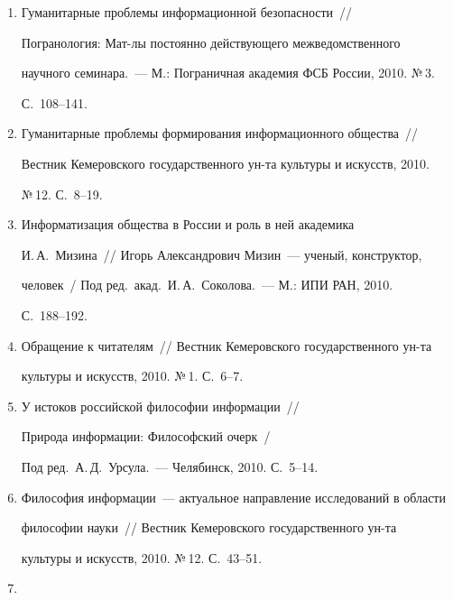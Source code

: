 \begin{enumerate}[1.]
и искусств, 2010. №\,10. С.~10--16.


\item {}


Гуманитарные проблемы информационной безопасности~/\!\!/  


Погранология: Мат-лы постоянно действующего межведомственного 


научного семинара.~--- М.: Пограничная академия ФСБ России, 2010. №\,3. 


С.~108--141.


\item {}


Гуманитарные проблемы формирования информационного общества~/\!\!/  


Вестник Кемеровского государственного ун-та культуры и искусств, 2010. 


№\,12. С.~8--19.


\item {}


Информатизация общества в России и роль в ней академика 


И.\,А.~Мизина~/\!\!/  Игорь Александрович Мизин~--- ученый, конструктор, 


человек~/ Под ред.\ акад.\ И.\,А.~Соколова.~--- М.: ИПИ РАН, 2010. 


С.~188--192.


\item {}


Обращение к читателям~/\!\!/  Вестник Кемеровского государственного ун-та 


культуры и искусств, 2010. №\,1. С.~6--7.


\item {}


У истоков российской философии информации~/\!\!/   


Природа информации: Философский очерк~/ 


Под ред.\ А.\,Д.~Урсула.~--- Челябинск, 2010. С.~5--14.


\item {}


Философия информации~--- актуальное направление исследований в области 


философии науки~/\!\!/  Вестник Кемеровского государственного ун-та 


культуры и искусств, 2010. №\,12. С.~43--51.


\item {}



\end{enumerate}
